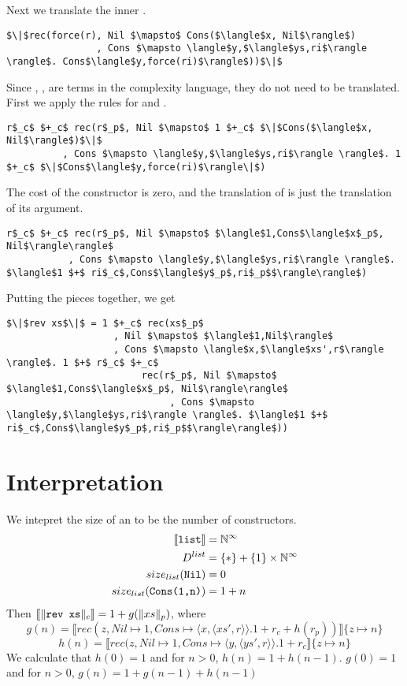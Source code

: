 %
Next we translate the inner .
%
\begin{lstlisting}
$\|$rec(force(r), Nil $\mapsto$ Cons($\langle$x, Nil$\rangle$)
                , Cons $\mapsto \langle$y,$\langle$ys,ri$\rangle \rangle$. Cons$\langle$y,force(ri)$\rangle$))$\|$
\end{lstlisting}
%
Since , ,  are terms in the complexity language, they do not
need to be translated.  First we apply the rules for  and .
%
\begin{lstlisting}
r$_c$ $+_c$ rec(r$_p$, Nil $\mapsto$ 1 $+_c$ $\|$Cons($\langle$x, Nil$\rangle$)$\|$
          , Cons $\mapsto \langle$y,$\langle$ys,ri$\rangle \rangle$. 1 $+_c$ $\|$Cons$\langle$y,force(ri)$\rangle\|$)
\end{lstlisting}
%
The cost of the  constructor is zero, and the translation of 
is just the translation of its argument.
%
\begin{lstlisting}
r$_c$ $+_c$ rec(r$_p$, Nil $\mapsto$ $\langle$1,Cons$\langle$x$_p$, Nil$\rangle\rangle$
           , Cons $\mapsto \langle$y,$\langle$ys,ri$\rangle \rangle$. $\langle$1 $+$ ri$_c$,Cons$\langle$y$_p$,ri$_p$$\rangle\rangle$)
\end{lstlisting}
%
Putting the pieces together, we get
%
\begin{lstlisting}[frame=single]
$\|$rev xs$\|$ = 1 $+_c$ rec(xs$_p$
                   , Nil $\mapsto$ $\langle$1,Nil$\rangle$
                   , Cons $\mapsto \langle$x,$\langle$xs',r$\rangle \rangle$. 1 $+$ r$_c$ $+_c$
                        rec(r$_p$, Nil $\mapsto$ $\langle$1,Cons$\langle$x$_p$, Nil$\rangle\rangle$
                             , Cons $\mapsto \langle$y,$\langle$ys,ri$\rangle \rangle$. $\langle$1 $+$ ri$_c$,Cons$\langle$y$_p$,ri$_p$$\rangle\rangle$))
\end{lstlisting}
%
%
%
\section{Interpretation}
%
We intepret the size of an  to be the number of  constructors.
%
\begin{align*}
  \llbracket \texttt{list} \rrbracket &= \mathbb{N}^\infty \\
  D^{list} &= \{\ast\} + \{1\} \times \mathbb{N}^\infty \\
  size_{list}(\texttt{Nil}) &= 0 \\
  size_{list}(\texttt{Cons(1,n)}) &= 1 + n
\end{align*}
%
Then $\llbracket \| \texttt{rev xs} \|_c \rrbracket = 1 + g(\|xs\|_p)$, where
\[g(n) = \llbracket rec(z, Nil \mapsto 1, Cons \mapsto \langle x, \langle xs',r\rangle \rangle.1 + r_c + h(r_p))\rrbracket \{z \mapsto n\}\]
\[h(n) = \llbracket rec(z, Nil \mapsto 1, Cons \mapsto \langle y, \langle ys',r\rangle \rangle.1 + r_c \rrbracket \{z \mapsto n\}\]
%
We calculate that $h(0)=1$ and for $n > 0$, $h(n) = 1 + h(n-1)$.
$g(0) = 1$ and for $n > 0$, $g(n) = 1 + g(n-1) + h(n-1)$
